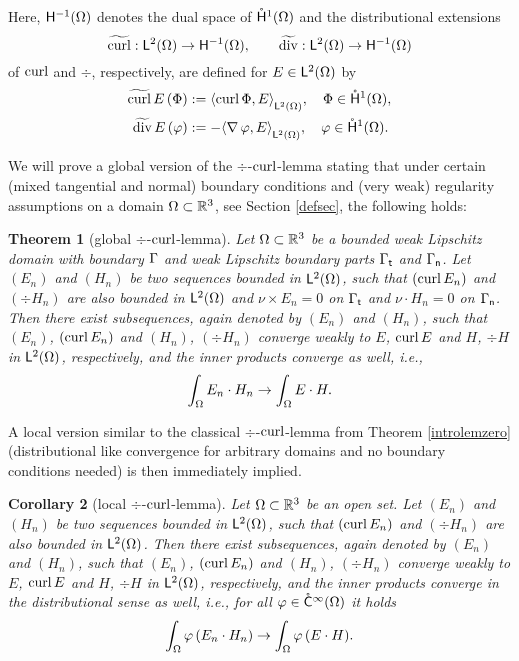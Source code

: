 \documentclass[a4paper]{amsart}
\newtheorem{theorom}{Theorem}
\newtheorem{corrom}[theorom]{Corollary}
\begin{document}
Here, $\overset{}{\mathsf{H}}{}^{-1}_{}(\Omega)$ denotes the dual space of $\mathring{\mathsf{H}}^{1}(\Omega)$ and the distributional extensions 
$$\widetilde{\operatorname{curl}}:\overset{}{\mathsf{L}}{}^{2}_{}(\Omega)\to\overset{}{\mathsf{H}}{}^{-1}_{}(\Omega),\qquad
\widetilde{\operatorname{div}}:\overset{}{\mathsf{L}}{}^{2}_{}(\Omega)\to\overset{}{\mathsf{H}}{}^{-1}_{}(\Omega)$$
of $\operatorname{curl}$ and $\div$, respectively, are defined for $E\in\overset{}{\mathsf{L}}{}^{2}_{}(\Omega)$ by
\begin{align*}
\widetilde{\operatorname{curl}}\,E\,(\Phi)&:=\langle\operatorname{curl}\Phi,E\rangle_{\overset{}{\mathsf{L}}{}^{2}_{}(\Omega)},\quad
\Phi\in\mathring{\mathsf{H}}^{1}(\Omega),\\
\widetilde{\operatorname{div}}\,E\,(\varphi)&:=-\langle\operatorname{\nabla}\varphi,E\rangle_{\overset{}{\mathsf{L}}{}^{2}_{}(\Omega)},\quad
\varphi\in\mathring{\mathsf{H}}^{1}(\Omega).
\end{align*}

We will prove a global version of the $\div$-$\operatorname{curl}$-lemma
stating that under certain (mixed tangential and normal) 
boundary conditions and (very weak) regularity assumptions on a domain $\Omega\subset\mathbb{R}^{3}$,
see Section \ref{defsec}, the following holds:

\begin{theorom}[global $\div$-$\operatorname{curl}$-lemma]
Let $\Omega\subset\mathbb{R}^{3}$ be a bounded weak Lipschitz domain
with boundary $\Gamma$ and weak Lipschitz boundary parts $\Gamma_{\mathsf{t}}$ and $\Gamma_{\mathsf{n}}$.
Let $(E_{n})$ and $(H_{n})$ be two sequences bounded in $\overset{}{\mathsf{L}}{}^{2}_{}(\Omega)$,
such that $(\operatorname{curl} E_{n})$ and $(\div H_{n})$ are also bounded in $\overset{}{\mathsf{L}}{}^{2}_{}(\Omega)$
and $\nu\times E_{n}=0$ on $\Gamma_{\mathsf{t}}$ and $\nu\cdot H_{n}=0$ on $\Gamma_{\mathsf{n}}$. Then there exist subsequences,
again denoted by $(E_{n})$ and $(H_{n})$, such that $(E_{n})$, $(\operatorname{curl} E_{n})$ and $(H_{n})$, $(\div H_{n})$ 
converge weakly to $E$, $\operatorname{curl} E$ and $H$, $\div H$ in $\overset{}{\mathsf{L}}{}^{2}_{}(\Omega)$, respectively,
and the inner products converge as well, i.e.,
$$\int_{\Omega}E_{n}\cdot H_{n}\to\int_{\Omega}E\cdot H.$$
\end{theorom}

A local version similar to the classical $\div$-$\operatorname{curl}$-lemma from Theorem \ref{introlemzero}
(distributional like convergence for arbitrary domains and no boundary conditions needed) 
is then immediately implied.

\begin{corrom}[local $\div$-$\operatorname{curl}$-lemma]
Let $\Omega\subset\mathbb{R}^{3}$ be an open set.
Let $(E_{n})$ and $(H_{n})$ be two sequences bounded in $\overset{}{\mathsf{L}}{}^{2}_{}(\Omega)$,
such that $(\operatorname{curl} E_{n})$ and $(\div H_{n})$ are also bounded in $\overset{}{\mathsf{L}}{}^{2}_{}(\Omega)$. Then there exist subsequences,
again denoted by $(E_{n})$ and $(H_{n})$, such that $(E_{n})$, $(\operatorname{curl} E_{n})$ and $(H_{n})$, $(\div H_{n})$ 
converge weakly to $E$, $\operatorname{curl} E$ and $H$, $\div H$ in $\overset{}{\mathsf{L}}{}^{2}_{}(\Omega)$, respectively,
and the inner products converge in the distributional sense as well, i.e.,
for all $\varphi\in\mathring{\mathsf{C}}^{\infty}(\Omega)$ it holds
$$\int_{\Omega}\varphi\,(E_{n}\cdot H_{n})\to\int_{\Omega}\varphi\,(E\cdot H).$$
\end{corrom}
\end{document}

